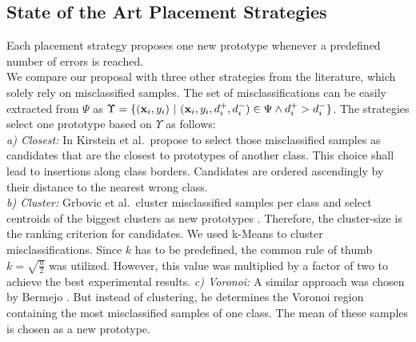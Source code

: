 \documentclass[conference]{IEEEtran}
\begin{document}
\subsection{State of the Art Placement Strategies}\label{placementAlgorithms}
Each placement strategy proposes one new prototype whenever a predefined number of errors is reached.\\
We compare our proposal with three other strategies from the literature, which solely rely on misclassified samples. The set of misclassifications can be easily  extracted
from $\Psi$ as $\Upsilon=\{ (\x_i,y_i)\ |\ (\x_i,y_i,d^+_i,d^-_i) \in \Psi \land d^+_i > d^-_i\}$. 
The strategies select one prototype based on $\Upsilon$ as follows:\\
\textit{a) Closest:}
In \cite{PN0805} Kirstein et al.\ propose to select those misclassified samples as candidates that are the closest to prototypes of another class. 
This choice shall lead to insertions along class borders. Candidates are ordered ascendingly by their distance to the nearest wrong class.\\ 
\textit{b) Cluster:}
Grbovic et al.\ cluster misclassified samples per class and select centroids of the biggest clusters as new prototypes \cite{DBLP:conf/ijcnn/GrbovicV09}.
Therefore, the cluster-size is the ranking criterion for candidates. We used k-Means to cluster misclassifications. Since $k$ has to be predefined, 
the common rule of thumb $k=\sqrt{\frac{n}{2}}$ was utilized. However, this value was multiplied by a factor of two to achieve the best experimental results.
\textit{c) Voronoi:}
A similar approach was chosen by Bermejo \cite{DBLP:conf/esann/BermejoCP98}. But instead of clustering, he determines the Voronoi region containing the most misclassified samples of one class. 
The mean of these samples is chosen as a new prototype.
\setcounter{figure}{0}
\end{document}

